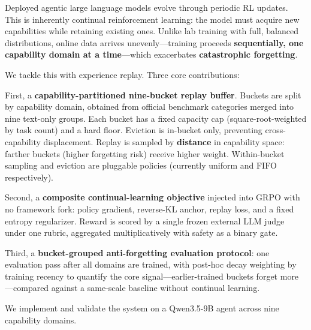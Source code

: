 \begin{abstracten}
Deployed agentic large language models evolve through periodic RL updates. This is inherently continual reinforcement learning: the model must acquire new capabilities while retaining existing ones. Unlike lab training with full, balanced distributions, online data arrives unevenly---training proceeds \textbf{sequentially, one capability domain at a time}---which exacerbates \textbf{catastrophic forgetting}.

We tackle this with experience replay. Three core contributions:

First, a \textbf{capability-partitioned nine-bucket replay buffer}. Buckets are split by capability domain, obtained from official benchmark categories merged into nine text-only groups. Each bucket has a fixed capacity cap (square-root-weighted by task count) and a hard floor. Eviction is in-bucket only, preventing cross-capability displacement. Replay is sampled by \textbf{distance} in capability space: farther buckets (higher forgetting risk) receive higher weight. Within-bucket sampling and eviction are pluggable policies (currently uniform and FIFO respectively).

Second, a \textbf{composite continual-learning objective} injected into GRPO with no framework fork: policy gradient, reverse-KL anchor, replay loss, and a fixed entropy regularizer. Reward is scored by a single frozen external LLM judge under one rubric, aggregated multiplicatively with safety as a binary gate.

Third, a \textbf{bucket-grouped anti-forgetting evaluation protocol}: one evaluation pass after all domains are trained, with post-hoc decay weighting by training recency to quantify the core signal---earlier-trained buckets forget more---compared against a same-scale baseline without continual learning.

We implement and validate the system on a Qwen3.5-9B agent across nine capability domains.
\end{abstracten}
